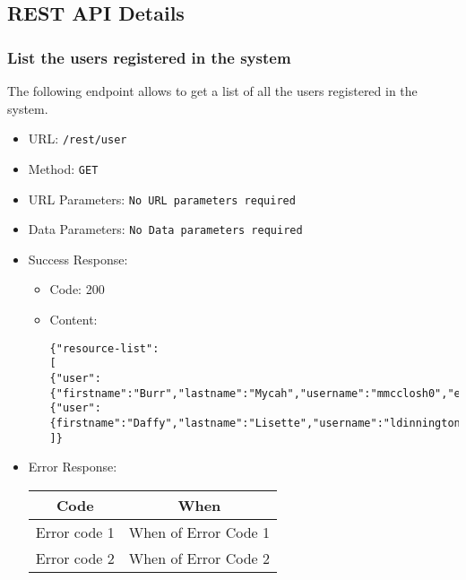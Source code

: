 \subsection{REST API Details}

\subsubsection*{List the users registered in the system}

The following endpoint allows to get a list of all the users registered in the system.

\begin{itemize}
    \item URL: \texttt{/rest/user}
    \item Method: \texttt{GET}
    \item URL Parameters: \texttt{No URL parameters required}
    \item Data Parameters: \texttt{No Data parameters required}
    \item Success Response: 
    \begin{itemize}
        \item Code: 200
        \item Content: 
        \begin{lstlisting}
{"resource-list":
[
{"user":{"firstname":"Burr","lastname":"Mycah","username":"mmcclosh0","email":"mchaudret0@dailymail.co.uk","telegram_chat_id":null}},
{"user":{firstname":"Daffy","lastname":"Lisette","username":"ldinningtont","email":"lgianettinit@wp.com","telegram_chat_id":null}}
]} 
        \end{lstlisting}
        
    \end{itemize}
    \item Error Response:
    \begin{table}[!h]
    \centering 
    \begin{tabular}{|c|c|}
    \hline
    \multicolumn{1}{|c|}{\textbf{Code}} & \multicolumn{1}{c|}{\textbf{When}} \\ \hline
    Error code 1 & When of Error Code 1 \\\hline
    Error code 2 & When of Error Code 2 \\\hline
    \end{tabular} 
    \end{table} 
    
\end{itemize}




